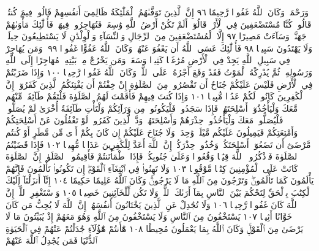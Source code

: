 وَرَحْمَةࣰۚ وَكَانَ ٱللَّهُ غَفُورࣰا رَّحِيمًا ٩٦ إِنَّ ٱلَّذِينَ تَوَفَّىٰهُمُ ٱلْمَلَٰٓئِكَةُ
ظَالِمِيٓ أَنفُسِهِمْ قَالُوا۟ فِيمَ كُنتُمْۖ قَالُوا۟ كُنَّا مُسْتَضْعَفِينَ فِي ٱلْأَرْضِۚ
قَالُوٓا۟ أَلَمْ تَكُنْ أَرْضُ ٱللَّهِ وَٰسِعَةࣰ فَتُهَاجِرُوا۟ فِيهَاۚ فَأُو۟لَٰٓئِكَ مَأْوَىٰهُمْ
جَهَنَّمُۖ وَسَآءَتْ مَصِيرًا ٩٧ إِلَّا ٱلْمُسْتَضْعَفِينَ مِنَ ٱلرِّجَالِ
وَٱلنِّسَآءِ وَٱلْوِلْدَٰنِ لَا يَسْتَطِيعُونَ حِيلَةࣰ وَلَا يَهْتَدُونَ سَبِيلࣰا ٩٨
فَأُو۟لَٰٓئِكَ عَسَى ٱللَّهُ أَن يَعْفُوَ عَنْهُمْۚ وَكَانَ ٱللَّهُ عَفُوًّا غَفُورࣰا ٩٩۞ وَمَن
يُهَاجِرْ فِي سَبِيلِ ٱللَّهِ يَجِدْ فِي ٱلْأَرْضِ مُرَٰغَمࣰا كَثِيرࣰا وَسَعَةࣰۚ وَمَن
يَخْرُجْ مِنۢ بَيْتِهِۦ مُهَاجِرًا إِلَى ٱللَّهِ وَرَسُولِهِۦ ثُمَّ يُدْرِكْهُ ٱلْمَوْتُ فَقَدْ
وَقَعَ أَجْرُهُۥ عَلَى ٱللَّهِۗ وَكَانَ ٱللَّهُ غَفُورࣰا رَّحِيمࣰا ١٠٠ وَإِذَا ضَرَبْتُمْ فِي
ٱلْأَرْضِ فَلَيْسَ عَلَيْكُمْ جُنَاحٌ أَن تَقْصُرُوا۟ مِنَ ٱلصَّلَوٰةِ إِنْ خِفْتُمْ
أَن يَفْتِنَكُمُ ٱلَّذِينَ كَفَرُوٓا۟ۚ إِنَّ ٱلْكَٰفِرِينَ كَانُوا۟ لَكُمْ عَدُوࣰّا مُّبِينࣰا ١٠١
وَإِذَا كُنتَ فِيهِمْ فَأَقَمْتَ لَهُمُ ٱلصَّلَوٰةَ فَلْتَقُمْ طَآئِفَةࣱ
مِّنْهُم مَّعَكَ وَلْيَأْخُذُوٓا۟ أَسْلِحَتَهُمْۖ فَإِذَا سَجَدُوا۟ فَلْيَكُونُوا۟
مِن وَرَآئِكُمْ وَلْتَأْتِ طَآئِفَةٌ أُخْرَىٰ لَمْ يُصَلُّوا۟ فَلْيُصَلُّوا۟
مَعَكَ وَلْيَأْخُذُوا۟ حِذْرَهُمْ وَأَسْلِحَتَهُمْۗ وَدَّ ٱلَّذِينَ
كَفَرُوا۟ لَوْ تَغْفُلُونَ عَنْ أَسْلِحَتِكُمْ وَأَمْتِعَتِكُمْ فَيَمِيلُونَ
عَلَيْكُم مَّيْلَةࣰ وَٰحِدَةࣰۚ وَلَا جُنَاحَ عَلَيْكُمْ إِن كَانَ بِكُمْ
أَذࣰى مِّن مَّطَرٍ أَوْ كُنتُم مَّرْضَىٰٓ أَن تَضَعُوٓا۟ أَسْلِحَتَكُمْۖ
وَخُذُوا۟ حِذْرَكُمْۗ إِنَّ ٱللَّهَ أَعَدَّ لِلْكَٰفِرِينَ عَذَابࣰا مُّهِينࣰا ١٠٢
فَإِذَا قَضَيْتُمُ ٱلصَّلَوٰةَ فَٱذْكُرُوا۟ ٱللَّهَ قِيَٰمࣰا وَقُعُودࣰا وَعَلَىٰ
جُنُوبِكُمْۚ فَإِذَا ٱطْمَأْنَنتُمْ فَأَقِيمُوا۟ ٱلصَّلَوٰةَۚ إِنَّ ٱلصَّلَوٰةَ
كَانَتْ عَلَى ٱلْمُؤْمِنِينَ كِتَٰبࣰا مَّوْقُوتࣰا ١٠٣ وَلَا تَهِنُوا۟ فِي
ٱبْتِغَآءِ ٱلْقَوْمِۖ إِن تَكُونُوا۟ تَأْلَمُونَ فَإِنَّهُمْ يَأْلَمُونَ كَمَا
تَأْلَمُونَۖ وَتَرْجُونَ مِنَ ٱللَّهِ مَا لَا يَرْجُونَۗ وَكَانَ ٱللَّهُ
عَلِيمًا حَكِيمًا ١٠٤ إِنَّآ أَنزَلْنَآ إِلَيْكَ ٱلْكِتَٰبَ بِٱلْحَقِّ لِتَحْكُمَ
بَيْنَ ٱلنَّاسِ بِمَآ أَرَىٰكَ ٱللَّهُۚ وَلَا تَكُن لِّلْخَآئِنِينَ خَصِيمࣰا ١٠٥
وَٱسْتَغْفِرِ ٱللَّهَۖ إِنَّ ٱللَّهَ كَانَ غَفُورࣰا رَّحِيمࣰا ١٠٦ وَلَا تُجَٰدِلْ
عَنِ ٱلَّذِينَ يَخْتَانُونَ أَنفُسَهُمْۚ إِنَّ ٱللَّهَ لَا يُحِبُّ مَن كَانَ
خَوَّانًا أَثِيمࣰا ١٠٧ يَسْتَخْفُونَ مِنَ ٱلنَّاسِ وَلَا يَسْتَخْفُونَ
مِنَ ٱللَّهِ وَهُوَ مَعَهُمْ إِذْ يُبَيِّتُونَ مَا لَا يَرْضَىٰ مِنَ ٱلْقَوْلِۚ
وَكَانَ ٱللَّهُ بِمَا يَعْمَلُونَ مُحِيطًا ١٠٨ هَٰٓأَنتُمْ هَٰٓؤُلَآءِ
جَٰدَلْتُمْ عَنْهُمْ فِي ٱلْحَيَوٰةِ ٱلدُّنْيَا فَمَن يُجَٰدِلُ ٱللَّهَ عَنْهُمْ
